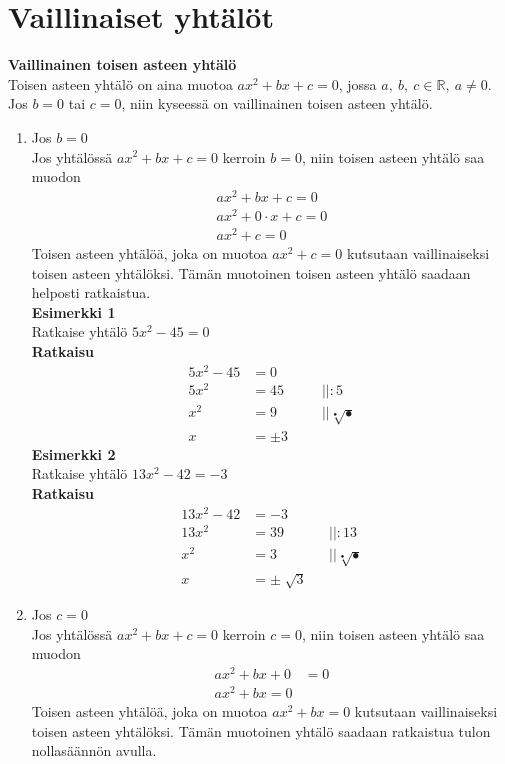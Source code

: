 \section{Vaillinaiset yhtälöt}
\textbf{Vaillinainen toisen asteen yhtälö} \\ 
Toisen asteen yhtälö on aina muotoa $ax^2+bx+c=0$, jossa $a, \ b, \ c \in \mathbb{R}, \ a \neq 0$. Jos $b=0$ tai $c=0$, niin kyseessä on vaillinainen toisen asteen yhtälö. \\  
\begin{enumerate}
\item{Jos $b=0$} \\
Jos yhtälössä $ax^2+bx+c=0$ kerroin $b=0$, niin toisen asteen yhtälö saa muodon
\begin{align*}
ax^2+bx+c=0 \\
ax^2+0 \cdot x+c=0 \\
ax^2+c=0 
\end{align*}
Toisen asteen yhtälöä, joka on muotoa $ax^2+c=0$ kutsutaan vaillinaiseksi toisen asteen yhtälöksi. Tämän muotoinen toisen asteen yhtälö saadaan helposti ratkaistua.\\ 
\textbf{Esimerkki 1} \\
Ratkaise yhtälö $5x^2-45=0$ \\
\textbf{Ratkaisu} 
\begin{align*}
5x^2-45&=0 \\
5x^2&=45  \ \ \ \ \ &&||:5 \\
x^2&=9 &&|| \sqrt[•]{•} \\
x&= \pm 3   
\end{align*}
\textbf{Esimerkki 2} \\ 
Ratkaise yhtälö $13x^2-42=-3$ \\
\textbf{Ratkaisu} \\
\begin{align*}
13x^2-42&=-3 \\
13x^2&=39 \ \ \ \ \ &&||:13 \\
x^2&=3 \ \ \ \ \ &&|| \sqrt[•]{•} \\
x&=\pm \sqrt[]{3}
\end{align*}
\item{Jos $c=0$} \\
Jos yhtälössä $ax^2+bx+c=0$ kerroin $c=0$, niin toisen asteen yhtälö saa muodon
\begin{align*}
ax^2+bx+0&=0 \\
ax^2+bx=0
\end{align*}
Toisen asteen yhtälöä, joka on muotoa $ax^2+bx=0$ kutsutaan vaillinaiseksi toisen asteen yhtälöksi. Tämän muotoinen yhtälö saadaan ratkaistua tulon nollasäännön avulla. \\

\end{enumerate}
